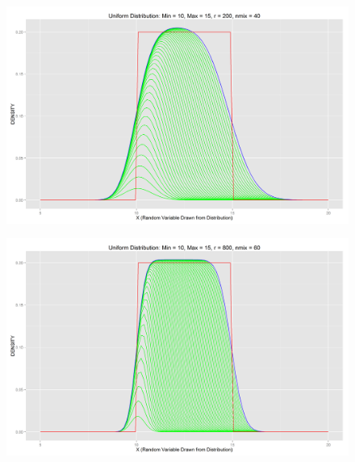\documentclass[letter]{article}
\begin{document}
\begin{figure}[H]
\includegraphics[scale=.27]{figures/unifdist_10_15_200_40.png}\\
\end{figure}
\begin{figure}[H]
\centering
\includegraphics[scale=.54]{figures/unifdist_10_15_800_60.png}
\end{figure}
\end{document}
